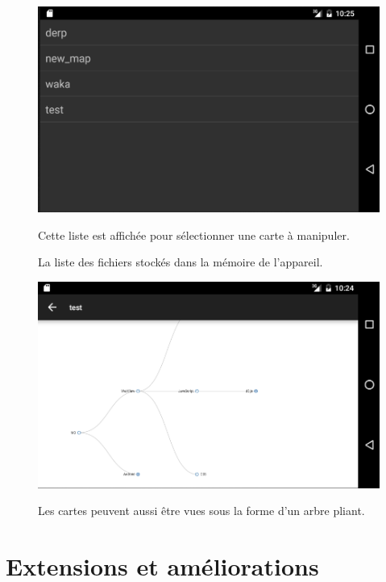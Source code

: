 \documentclass[11pt,a4paper,margin=0.5in]{report}
\begin{document}
\begin{figure}[!ht]
  \centering
    \includegraphics[width=1\textwidth]{choice.png} \\[0.25in]
    \caption{La liste des fichiers stockés dans la mémoire de l'appareil.}
Cette liste est affichée pour sélectionner une carte à manipuler.
\end{figure}


\begin{figure}[!ht]
  \centering
    \includegraphics[width=1\textwidth]{coll.png} \\[0.25in]
    \caption{Les cartes peuvent aussi être vues sous la forme d'un arbre pliant.}
\end{figure}


\clearpage

\chapter{Extensions et améliorations}
\end{document}
